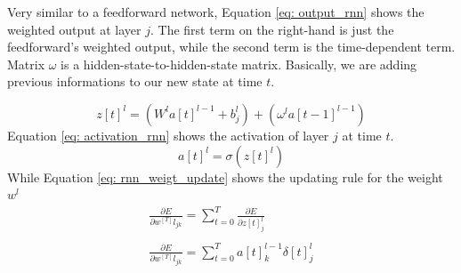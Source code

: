 \documentclass[11pt]{article}
\begin{document}
Very similar to a feedforward network, Equation \ref{eq: output_rnn} shows the weighted output at layer $j$. The first term on the right-hand is just the feedforward's weighted output, while the second term is the time-dependent term. Matrix $\omega$ is a hidden-state-to-hidden-state matrix. Basically, we are adding previous informations to our new state at time $t$.

\begin{equation}
z[t]^l = (W^la[t]^{l -1}+ b^l_j) + (\omega^l a[t-1]^{l-1})
\label{eq: output_rnn}	
\end{equation}
Equation \ref{eq: activation_rnn} shows the activation of layer $j$ at time $t$.
\begin{equation}
a[t]^l	= \sigma(z[t]^l)
\label{eq: activation_rnn}
\end{equation}
While Equation \ref{eq: rnn_weigt_update} shows the updating rule for the weight $w^l$
\begin{equation}
\begin{matrix}
\frac{\partial E}{\partial w^[T]l_{jk}} =\sum^T_{t=0} \frac{\partial E}{\partial z[t]^l_j}	\\ 
\\
\frac{\partial E}{\partial w^[T]l_{jk}} = \sum^T_{t=0} a[t]^{l-1}_k \delta[t]^l_j	
\end{matrix}
\label{eq: rnn_weigt_update}
\end{equation}
\end{document}
